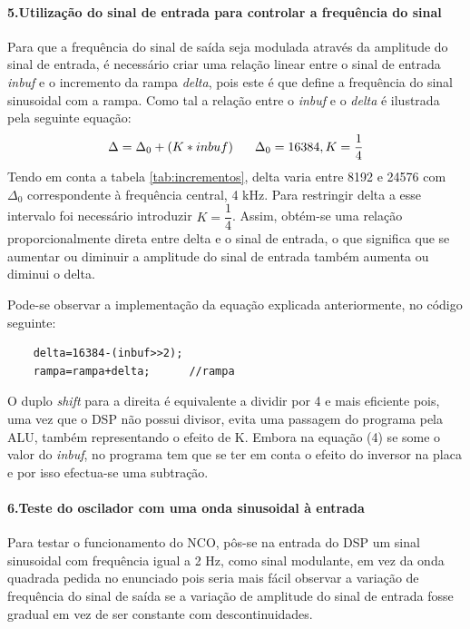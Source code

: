 \documentclass[11pt]{article}
\numberwithin{equation}{section}
\begin{document}
\paragraph{5.Utilização do sinal de entrada para controlar a frequência do sinal} \hspace{0pt}

Para que a frequência do sinal de saída seja modulada através da amplitude do sinal de entrada, é necessário criar uma relação linear entre o sinal de entrada \textit{inbuf} e o incremento da rampa \textit{delta}, pois este é que define a frequência do sinal sinusoidal com a rampa. Como tal a relação entre o \textit{inbuf} e o \textit{delta} é ilustrada pela seguinte equação:
\begin{equation}
	\Delta=\Delta_0+(K*inbuf)	\hspace{6 mm}\Delta_0=16384, K=\frac{1}{4}
	\label{delta}
\end{equation}
Tendo em conta a tabela \ref{tab:incrementos}, delta varia entre 8192 e 24576 com $\Delta_0$ correspondente à frequência central, 4 kHz. Para restringir delta a esse intervalo foi necessário introduzir $K=\dfrac{1}{4}$. Assim, obtém-se uma relação proporcionalmente direta entre delta e o sinal de entrada, o que significa que se aumentar ou diminuir a amplitude do sinal de entrada também aumenta ou diminui o delta.

Pode-se observar a implementação da equação explicada anteriormente, no código seguinte:

\begin{lstlisting}
	delta=16384-(inbuf>>2); 
	rampa=rampa+delta;		//rampa
\end{lstlisting}
O duplo \textit{shift} para a direita é equivalente a dividir por 4 e mais eficiente pois, uma vez que o DSP não possui divisor, evita uma passagem do programa pela ALU, também representando o efeito de K.
Embora na equação (4) se some o valor do \textit{inbuf}, no programa tem que se ter em conta o efeito do inversor na placa e por isso efectua-se uma subtração.

\paragraph{6.Teste do oscilador com uma onda sinusoidal à entrada} \label{para:P1-6} \hspace{0pt}

Para testar o funcionamento do NCO, pôs-se na entrada do DSP um sinal sinusoidal com frequência igual a 2 Hz, como sinal modulante, em vez da onda quadrada pedida no enunciado pois seria mais fácil observar a variação de frequência do sinal de saída se a variação de amplitude do sinal de entrada fosse gradual em vez de ser constante com descontinuidades. 
\vspace{1 mm}
\end{document}
